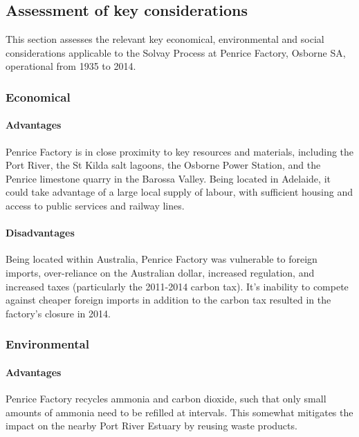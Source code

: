 \documentclass[12pt, a4paper]{article}
\begin{document}
\pagebreak

\subsection{Assessment of key considerations}

This section assesses the relevant key economical, environmental and social considerations applicable to the Solvay Process at Penrice Factory, Osborne SA, operational from 1935 to 2014.

\subsubsection{Economical}

\paragraph{Advantages}
Penrice Factory is in close proximity to key resources and materials, including the Port River, the St Kilda salt lagoons, the Osborne Power Station, and the Penrice limestone quarry in the Barossa Valley. Being located in Adelaide, it could take advantage of a large local supply of labour, with sufficient housing and access to public services and railway lines.

\paragraph{Disadvantages}

Being located within Australia, Penrice Factory was vulnerable to foreign imports, over-reliance on the Australian dollar, increased regulation, and increased taxes (particularly the 2011-2014 carbon tax). It's inability to compete against cheaper foreign imports in addition to the carbon tax resulted in the factory's closure in 2014.

\subsubsection{Environmental}

\paragraph{Advantages}
Penrice Factory recycles ammonia and carbon dioxide, such that only small amounts of ammonia need to be refilled at intervals. This somewhat mitigates the impact on the nearby Port River Estuary by reusing waste products. 
\end{document}
